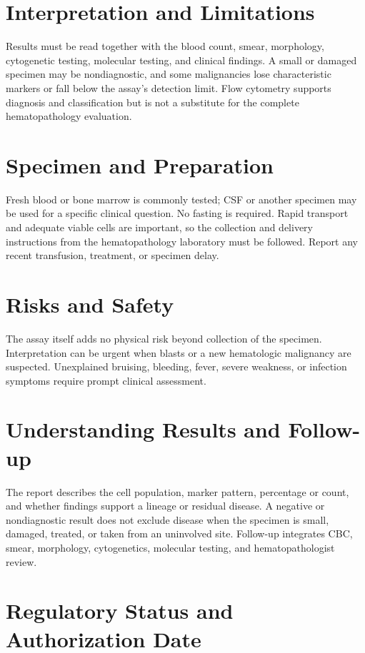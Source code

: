 \section*{Interpretation and Limitations}
Results must be read together with the blood count, smear, morphology, cytogenetic testing, molecular testing, and clinical findings. A small or damaged specimen may be nondiagnostic, and some malignancies lose characteristic markers or fall below the assay's detection limit. Flow cytometry supports diagnosis and classification but is not a substitute for the complete hematopathology evaluation.
\section*{Specimen and Preparation}
Fresh blood or bone marrow is commonly tested; CSF or another specimen may be used for a specific clinical question. No fasting is required. Rapid transport and adequate viable cells are important, so the collection and delivery instructions from the hematopathology laboratory must be followed. Report any recent transfusion, treatment, or specimen delay.

\section*{Risks and Safety}
The assay itself adds no physical risk beyond collection of the specimen. Interpretation can be urgent when blasts or a new hematologic malignancy are suspected. Unexplained bruising, bleeding, fever, severe weakness, or infection symptoms require prompt clinical assessment.

\section*{Understanding Results and Follow-up}
The report describes the cell population, marker pattern, percentage or count, and whether findings support a lineage or residual disease. A negative or nondiagnostic result does not exclude disease when the specimen is small, damaged, treated, or taken from an uninvolved site. Follow-up integrates CBC, smear, morphology, cytogenetics, molecular testing, and hematopathologist review.

\section*{Regulatory Status and Authorization Date}

\clearpage
